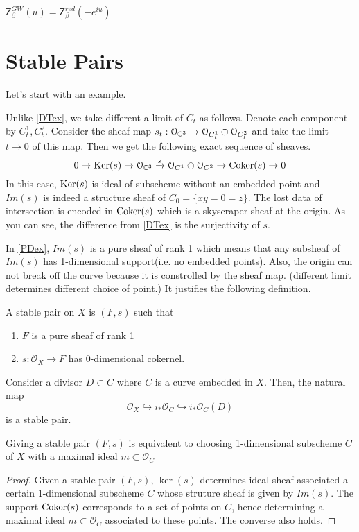 \begin{conj}
    $\mathsf{Z}^{GW}_{\beta}(u)=\mathsf{Z}^{red}_{\beta}(-e^{iu})$
\end{conj}

\section{Stable Pairs}
Let's start with an example.
\begin{eg}\label{PDex}
    Unlike \ref{DTex}, we take different a limit of $C_t$ as follows. Denote each component by $C^1_t, C^2_t$. Consider the sheaf map $s_t:\mathcal{O}_{\mathbb C^3} \to \mathcal{O}_{C^1_t} \oplus \mathcal{O}_{C^2_t}$ and take the limit $t \to 0$ of this map. Then we get the following exact sequence of sheaves.
    \begin{equation*}
        0 \to \operatorname{Ker}(s) \to \mathcal{O}_{\mathbb C^3} \xrightarrow{s} \mathcal{O}_{C^1} \oplus \mathcal{O}_{C^2} \to \operatorname{Coker}(s) \to 0
    \end{equation*}
    In this case, $\operatorname{Ker}(s)$ is ideal of subscheme without an embedded point and $Im(s)$ is indeed a structure sheaf of $C_0=\{xy=0=z\}$. The lost data of intersection is encoded in $\operatorname{Coker}(s)$ which is a skyscraper sheaf at the origin. As you can see, the difference from \ref{DTex} is the surjectivity of $s$. 
\end{eg}
In \ref{PDex}, $Im(s)$ is a pure sheaf of rank 1 which means that any subsheaf of $Im(s)$ has 1-dimensional support(i.e. no embedded points). Also, the origin can not break off the curve because it is constrolled by the sheaf map. (different limit determines different choice of point.) It justifies the following definition.
\begin{defin}
    A stable pair on $X$ is $(F, s)$ such that 
    \begin{enumerate}
        \item $F$ is a pure sheaf of rank 1
        \item $s:\mathcal{O}_X \to F$ has 0-dimensional cokernel.
    \end{enumerate}
\end{defin}
\begin{eg}
Consider a divisor $D \subset C$ where $C$ is a curve embedded in $X$. Then, the natural map 
\begin{equation*}
    \mathcal{O}_X \hookrightarrow i_*\mathcal{O}_C \hookrightarrow i_*\mathcal{O}_C(D)
\end{equation*}
is a stable pair.
\end{eg}
\begin{lem}
    Giving a stable pair $(F,s)$ is equivalent to choosing 1-dimensional subscheme $C$ of $X$ with a maximal ideal $m \subset \mathcal{O}_C$
\end{lem}
\begin{proof}
    Given a stable pair $(F,s)$, $\ker(s)$ determines ideal sheaf associated a certain 1-dimensional subscheme $C$ whose struture sheaf is given by $Im(s)$. The support $\operatorname{Coker}(s)$ corresponds to a set of points on $C$, hence determining a maximal ideal $m \subset \mathcal{O}_C$ associated to these points. The converse also holds. 
\end{proof}

